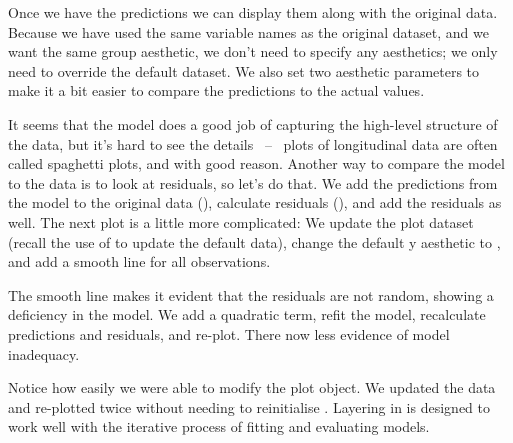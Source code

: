 Once we have the predictions we can display them along with the original data.  Because we have used the same variable names as the original  dataset, and we want the same group aesthetic, we don't need to specify any aesthetics; we only need to override the default dataset.  We also set two aesthetic parameters to make it a bit easier to compare the predictions to the actual values.

% 


It seems that the model does a good job of capturing the high-level structure of the data, but it's hard to see the details ~--~ plots of longitudinal data are often called spaghetti plots, and with good reason.  Another way to compare the model to the data is to look at residuals, so let's do that.  We add the predictions from the model to the original data (), calculate residuals (), and add the residuals as well.  The next plot is a little more complicated: We update the plot dataset (recall the use of \code{\%+\%} to update the default data), change the default y aesthetic to , and add a smooth line for all observations.

% 
% 


The smooth line makes it evident that the residuals are not random, showing a deficiency in the model.  We add a quadratic term, refit the model, recalculate predictions and residuals, and re-plot.  There now less evidence of model inadequacy.

% 
% 


Notice how easily we were able to modify the plot object.  We updated the data and re-plotted twice without needing to reinitialise .  Layering in \ggplot is designed to work well with the iterative process of fitting and evaluating models.


